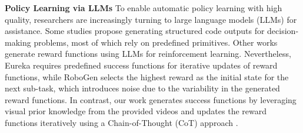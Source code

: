 \textbf{Policy Learning via LLMs}
To enable automatic policy learning with high quality, researchers are increasingly turning to large language models (LLMs) for assistance. Some studies \citep{liang2023code, huang2023instruct2act, lin2023text2motion, wang2023voyager} propose generating structured code outputs for decision-making problems, most of which rely on predefined primitives. Other works \citep{yu2023language, ma2023eureka, wang2023robogen} generate reward functions using LLMs for reinforcement learning. Nevertheless, Eureka \citep{ma2023eureka} requires predefined success functions for iterative updates of reward functions, while RoboGen \citep{wang2023robogen} selects the highest reward as the initial state for the next sub-task, which introduces noise due to the variability in the generated reward functions. In contrast, our work generates success functions by leveraging visual prior knowledge from the provided videos and updates the reward functions iteratively using a Chain-of-Thought (CoT) approach \citep{wei2022chain}.
